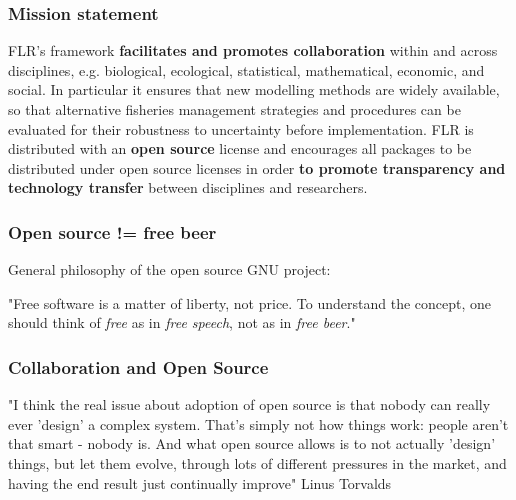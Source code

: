 \documentclass{beamer}%
\begin{document}
\begin{frame}
   \frametitle{Mission statement}

FLR's framework \textbf{facilitates and promotes collaboration} within and across disciplines, e.g. biological, ecological, statistical, mathematical, economic, and social. In particular it ensures that new modelling methods are widely available, so that alternative fisheries management strategies and procedures can be evaluated for their robustness to uncertainty before implementation.
\pause\newline\newline
FLR is distributed with an \textbf{open source} license and encourages all packages to be distributed under open source licenses in order \textbf{to promote transparency and technology transfer} between disciplines and researchers.
\end{frame}

\begin{frame}
\frametitle{Open source != free beer}
General philosophy of the open source GNU project:\newline\newline

\textrm{{\footnotesize{
"Free software is a matter of liberty, not price.  To understand the concept, one should think of \emph{free} as in \emph{free speech}, not as in \emph{free beer}."
}}}
\end{frame}

\begin{frame}
\frametitle{Collaboration and Open Source}
\textrm{{\footnotesize{
"I think the real issue about adoption of open source is that nobody can really ever 'design' a complex system.  That's simply not how things work: people aren't that smart - nobody is.  And what open source allows is to not actually 'design' things, but let them evolve, through lots of different pressures in the market, and having the end result just continually improve"\newline\newline
}}}
Linus Torvalds
\end{frame}
\end{document}
